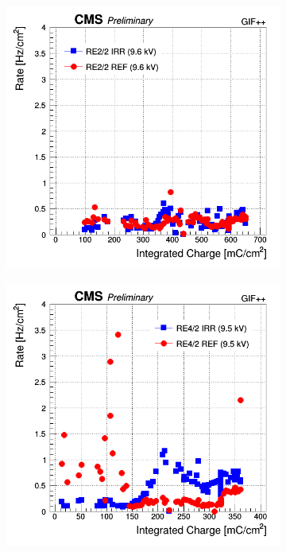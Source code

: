\begin{figure}[H]
\begin{subfigure}{0.5\linewidth}
        	\caption{\label{fig:GIFpp-Dark-rate-mon:B}}
    	\end{subfigure}
    	\begin{subfigure}{0.5\linewidth}
    		\centering
			\includegraphics[width = \linewidth]{fig/chapt5/RE2-2-Noise-rate-vs-Time-9600.png}
        	\caption{\label{fig:GIFpp-Dark-rate-mon:C}}
    	\end{subfigure}
    	\begin{subfigure}{0.5\linewidth}
			\centering
    		\includegraphics[width = \linewidth]{fig/chapt5/RE4-2-Noise-rate-vs-Time-9500.png}

\end{subfigure}
\end{figure}
